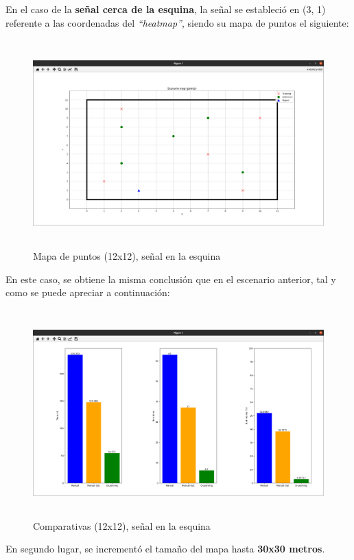 En el caso de la \textbf{señal cerca de la esquina}, la señal se estableció en (3, 1) referente a las coordenadas del \emph{``heatmap''}, siendo su mapa de puntos el siguiente:

\begin{figure} [H]
    \begin{center}
    \includegraphics[height=8cm]{imagenes/cap4/19_mapa_p_esq_12.png}
    \end{center}
    \caption[Mapa de puntos (12x12), señal en la esquina]{Mapa de puntos (12x12), señal en la esquina}
    \label{fig:map_p_esq_12}
\end{figure}

En este caso, se obtiene la misma conclusión que en el escenario anterior, tal y como se puede apreciar a continuación:\\

\begin{figure} [H]
    \begin{center}
    \includegraphics[height=8cm]{imagenes/cap4/20_comp_esq_12.png}
    \end{center}
    \caption[Comparativas (12x12), señal en la esquina]{Comparativas (12x12), señal en la esquina}
    \label{fig:comp_esq_12}
\end{figure}
\newpage
En segundo lugar, se incrementó el tamaño del mapa hasta \textbf{30x30 metros}.\\

